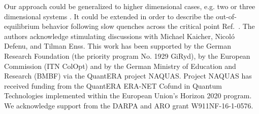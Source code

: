 \documentclass[pra,twocolumn,
superscriptaddress,
showpacs,
aps
]{revtex4-1}
\begin{document}
Our approach could be generalized to higher dimensional cases, e.g. two or three dimensional systems \cite{Zhang:2019}. It could be extended in order to describe the out-of-equilibrium behavior following slow quenches across the critical point Ref.~\cite{Defenu:2019}. 
\acknowledgements
The authors acknowledge stimulating discussions with Michael Kaicher, Nicol\'o Defenu, and Tilman Enss. This work has been supported by the German Research Foundation (the priority program No. 1929 GiRyd), by the European  Commission (ITN ColOpt) and by the German Ministry of Education and Research (BMBF) via the QuantERA project NAQUAS. Project NAQUAS has
received funding from the QuantERA ERA-NET Cofund in Quantum Technologies implemented within the European Union's Horizon 2020 program. We acknowledge support from the DARPA and ARO grant W911NF-16-1-0576.
\end{document}
